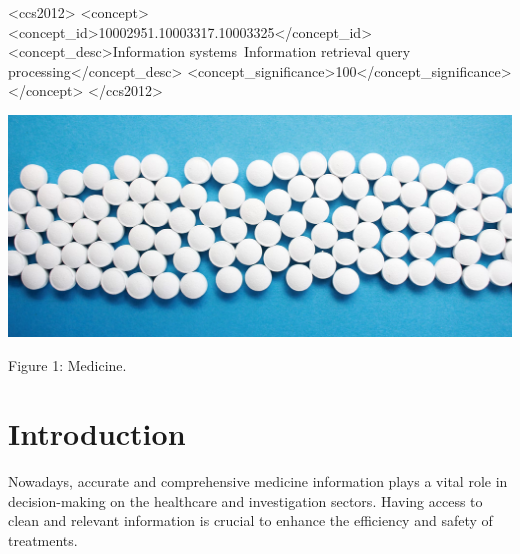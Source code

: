 \documentclass[sigconf]{acmart}
\begin{document}
\begin{CCSXML}
<ccs2012>
   <concept>
       <concept_id>10002951.10003317.10003325</concept_id>
       <concept_desc>Information systems~Information retrieval query processing</concept_desc>
       <concept_significance>100</concept_significance>
       </concept>
 </ccs2012>
\end{CCSXML}


\begin{teaserfigure}
  \includegraphics[width=\textwidth]{medicine.png}
  \caption{Figure 1: Medicine.}
  \Description{}
  \label{fig:teaser}
\end{teaserfigure}


\maketitle

\section{Introduction}
Nowadays, accurate and comprehensive medicine information plays a vital role in decision-making on the healthcare and investigation sectors. Having access to clean and relevant information is crucial to enhance the efficiency and safety of treatments.
\end{document}

